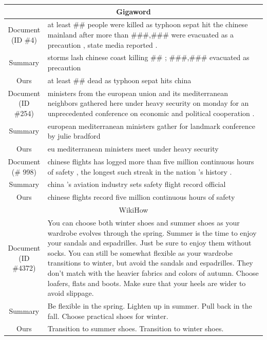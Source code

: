 \begin{table}[h!]
\begin{tabular}{c|p{}}
  \multicolumn{2}{c}{Gigaword} \\ \hline
  \makecell{Document\\(ID \#4)} & at least \#\# people were killed as typhoon sepat hit the chinese mainland after more than \#\#\#,\#\#\# were evacuated as a precaution , state media reported . \\\hline
  Summary & storms lash chinese coast killing \#\# ; \#\#\#,\#\#\# evacuated as precaution \\\hline
  Ours & at least \#\# dead as typhoon sepat hits china \\\hline
  \makecell{Document\\(ID \#254)} & ministers from the european union and its mediterranean neighbors gathered here under heavy security on monday for an unprecedented conference on economic and political cooperation . \\\hline
  Summary & european mediterranean ministers gather for landmark conference by julie bradford \\\hline
  Ours & eu mediterranean ministers meet under heavy security \\\hline
  \makecell{Document\\(\# 998)} & chinese flights has logged more than five million continuous hours of safety , the longest such streak in the nation 's history . \\\hline
  Summary & china 's aviation industry sets safety flight record official \\\hline
  Ours & chinese flights record five million continuous hours of safety \\\hline
  
  \multicolumn{2}{c}{WikiHow} \\\hline
  \makecell{Document\\(ID \#4372)} & You can choose both winter shoes and summer shoes as your wardrobe evolves through the spring. Summer is the time to enjoy your sandals and espadrilles. Just be sure to enjoy them without socks. You can still be somewhat flexible as your wardrobe transitions to winter, but avoid the sandals and espadrilles. They don't match with the heavier fabrics and colors of autumn. Choose loafers, flats and boots. Make sure that your heels are wider to avoid slippage. \\\hline
  Summary & Be flexible in the spring. Lighten up in summer. Pull back in the fall. Choose practical shoes for winter. \\\hline
  Ours & Transition to summer shoes. Transition to winter shoes. \\\hline
  

\end{tabular}
\end{table}
